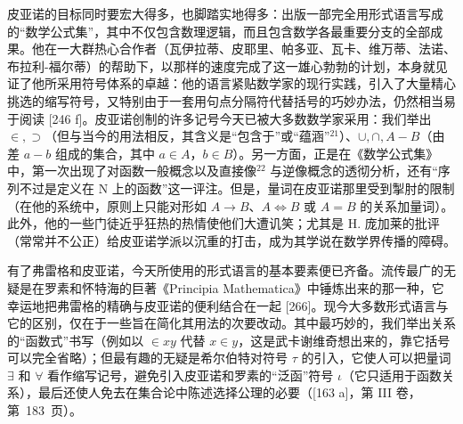 皮亚诺的目标同时要宏大得多，也脚踏实地得多：出版一部完全用形式语言写成的“数学公式集”，其中不仅包含数理逻辑，而且包含数学各最重要分支的全部成果。他在一大群热心合作者（瓦伊拉蒂、皮耶里、帕多亚、瓦卡、维万蒂、法诺、布拉利-福尔蒂）的帮助下，以那样的速度完成了这一雄心勃勃的计划，本身就见证了他所采用符号体系的卓越：他的语言紧贴数学家的现行实践，引入了大量精心挑选的缩写符号，又特别由于一套用句点分隔符代替括号的巧妙办法，仍然相当易于阅读 {[}246 f{]}。皮亚诺创制的许多记号今天已被大多数数学家采用：我们举出 \(\in, \supset\)（但与当今的用法相反，其含义是“包含于”或“蕴涵”\(^{21}\)）、\(\cup, \cap, A - B\)（由差 \(a - b\) 组成的集合，其中 \(a \in A\)，\(b \in B\)）。另一方面，正是在《数学公式集》中，第一次出现了对函数一般概念以及直接像\(^{22}\) 与逆像概念的透彻分析，还有“序列不过是定义在 N 上的函数”这一评注。但是，量词在皮亚诺那里受到掣肘的限制（在他的系统中，原则上只能对形如 \(A \to B\)、\(A \Leftrightarrow B\) 或 \(A = B\) 的关系加量词）。此外，他的一些门徒近乎狂热的热情使他们大遭讥笑；尤其是 H. 庞加莱的批评（常常并不公正）给皮亚诺学派以沉重的打击，成为其学说在数学界传播的障碍。

有了弗雷格和皮亚诺，今天所使用的形式语言的基本要素便已齐备。流传最广的无疑是在罗素和怀特海的巨著《Principia Mathematica》中锤炼出来的那一种，它幸运地把弗雷格的精确与皮亚诺的便利结合在一起 {[}266{]}。现今大多数形式语言与它的区别，仅在于一些旨在简化其用法的次要改动。其中最巧妙的，我们举出关系的“函数式”书写（例如以 \(\in xy\) 代替 \(x \in y\)，这是武卡谢维奇想出来的，靠它括号可以完全省略）；但最有趣的无疑是希尔伯特对符号 \(\tau\) 的引入，它使人可以把量词 \(\exists\) 和 \(\forall\) 看作缩写记号，避免引入皮亚诺和罗素的“泛函”符号 \(\iota\)（它只适用于函数关系），最后还使人免去在集合论中陈述选择公理的必要（{[}163 a{]}，第 III 卷，第~183~页）。

